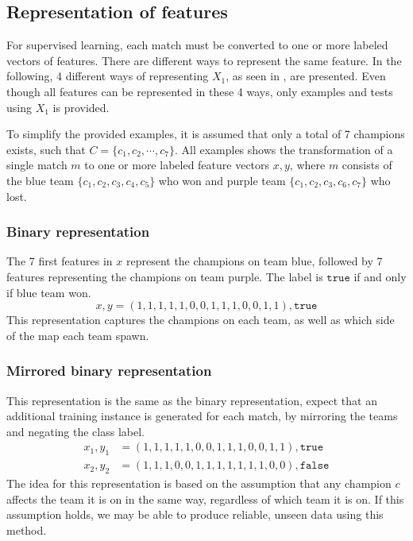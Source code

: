 \subsection{Representation of features}
\label{sec:representationoffeatures}
For supervised learning, each match must be converted to one or more labeled vectors of features.
There are different ways to represent the same feature. In the following,
4 different ways of representing $X_1$, as seen in , are presented.
Even though all features can be represented in these 4 ways, only examples and tests using $X_1$ is provided.

To simplify the provided examples, it is assumed that only a total of 7 champions exists, such that $C = \{c_1, c_2, \cdots, c_7\}$.
All examples shows the transformation of a single match $m$ to one or more labeled feature vectors $x, y$, where $m$ consists of the blue team $\{c_1,c_2,c_3,c_4,c_5\}$ who won and purple team $\{c_1,c_2,c_3,c_6,c_7\}$ who lost. %

\subsubsection{Binary representation}
The 7 first features in $x$ represent the champions on team blue, followed by 7 features representing the champions on team purple. The label is $\texttt{true}$ if and only if blue team won.
\[ x, y = (1,1,1,1,1,0,0,1,1,1,0,0,1,1), \texttt{true} \]
This representation captures the champions on each team, as well as which side of the map each team spawn.

\subsubsection{Mirrored binary representation}
This representation is the same as the binary representation, expect that an additional training instance is generated for each match, by mirroring the teams and negating the class label.
\begin{align*}
  x_1, y_1 &= (1,1,1,1,1,0,0,1,1,1,0,0,1,1), \texttt{true}\\
  x_2, y_2 &= (1,1,1,0,0,1,1,1,1,1,1,1,0,0), \texttt{false}
\end{align*}
The idea for this representation is based on the assumption that any champion $c$ affects the team it is on in the same way, regardless of which team it is on.
If this assumption holds, we may be able to produce reliable, unseen data using this method.

